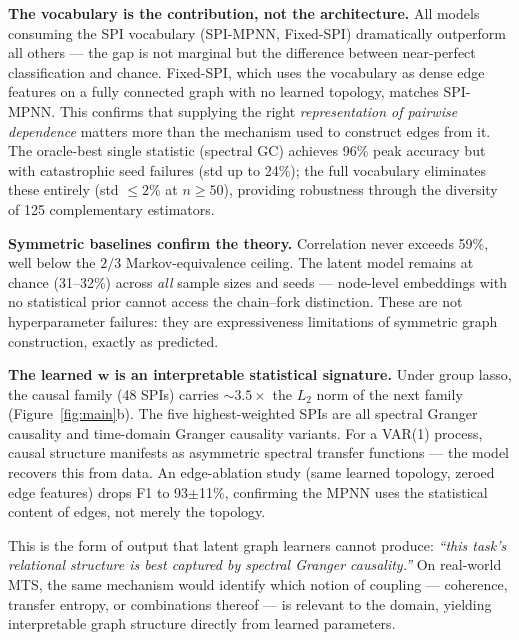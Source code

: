 \documentclass{article}
\begin{document}
\textbf{The vocabulary is the contribution, not the architecture.} All models consuming the SPI vocabulary (SPI-MPNN, Fixed-SPI) dramatically outperform all others --- the gap is not marginal but the difference between near-perfect classification and chance. Fixed-SPI, which uses the vocabulary as dense edge features on a fully connected graph with no learned topology, matches SPI-MPNN. This confirms that supplying the right \emph{representation of pairwise dependence} matters more than the mechanism used to construct edges from it. The oracle-best single statistic (spectral GC) achieves 96\% peak accuracy but with catastrophic seed failures (std up to 24\%); the full vocabulary eliminates these entirely (std ${\leq}2\%$ at $n {\geq} 50$), providing robustness through the diversity of 125 complementary estimators.

\textbf{Symmetric baselines confirm the theory.} Correlation never exceeds 59\%, well below the $2/3$ Markov-equivalence ceiling. The latent model \citep[cf.][]{wu2019} remains at chance (31--32\%) across \emph{all} sample sizes and seeds --- node-level embeddings with no statistical prior cannot access the chain--fork distinction. These are not hyperparameter failures: they are expressiveness limitations of symmetric graph construction, exactly as predicted.

\textbf{The learned $\mathbf{w}$ is an interpretable statistical signature.} Under group lasso, the causal family (48 SPIs) carries ${\sim}3.5{\times}$ the $L_2$ norm of the next family (Figure~\ref{fig:main}b). The five highest-weighted SPIs are all spectral Granger causality and time-domain Granger causality variants. For a VAR(1) process, causal structure manifests as asymmetric spectral transfer functions \citep{geweke1982} --- the model recovers this from data. An edge-ablation study (same learned topology, zeroed edge features) drops F1 to 93$\pm$11\%, confirming the MPNN uses the statistical content of edges, not merely the topology.

This is the form of output that latent graph learners cannot produce: \emph{``this task's relational structure is best captured by spectral Granger causality.''} On real-world MTS, the same mechanism would identify which notion of coupling --- coherence, transfer entropy, or combinations thereof --- is relevant to the domain, yielding interpretable graph structure directly from learned parameters.



\end{document}
